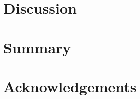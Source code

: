 \documentclass{emulateapj}
\begin{document}

\section{Discussion}
\label{sec:discussion}




\section{Summary}
\label{sec:summary}





\section{Acknowledgements}


\newpage





%
\end{document}
